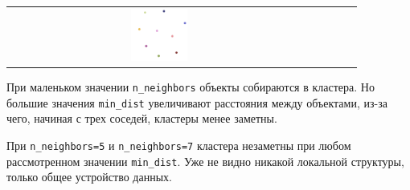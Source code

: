 \begin{tabular}{c|c|c|c|c}
	 \includegraphics*[width = 0.19\textwidth]{min=1,0,n=7.png} \\
\end{tabular}
\begin{figure}[H]
	\noindent {}
\end{figure}

При маленьком значении \verb|n_neighbors| объекты собираются в кластера. Но большие значения \verb|min_dist| увеличивают расстояния между объектами, из-за чего, начиная с трех соседей, кластеры менее заметны.

При \verb|n_neighbors=5| и \verb|n_neighbors=7| кластера незаметны при любом рассмотренном значении \verb|min_dist|. Уже не видно никакой локальной структуры, только общее устройство данных.

